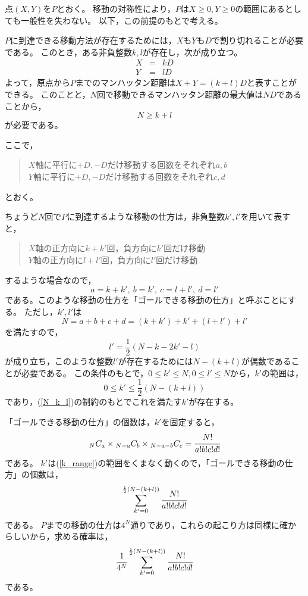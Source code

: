 \documentclass{article}
\begin{document}
点$(X, Y)$を$P$とおく。
移動の対称性により，$P$は$X \geq 0, Y \geq 0$の範囲にあるとしても一般性を失わない。
以下，この前提のもとで考える。

$P$に到達できる移動方法が存在するためには，$X$も$Y$も$D$で割り切れることが必要である。
このとき，ある非負整数$k, l$が存在し，次が成り立つ。
\begin{eqnarray*}
    X &=& kD \\
    Y &=& lD
\end{eqnarray*}
よって，原点から$P$までのマンハッタン距離は$X + Y = (k + l)D$と表すことができる。
このことと，$N$回で移動できるマンハッタン距離の最大値は$ND$であることから，
\begin{equation}
    \label{N_k_l}
    N \geq k + l
\end{equation}
が必要である。

ここで，
\begin{quote}
    $X$軸に平行に$+D, -D$だけ移動する回数をそれぞれ$a, b$ \\
    $Y$軸に平行に$+D, -D$だけ移動する回数をそれぞれ$c, d$
\end{quote}
とおく。

ちょうど$N$回で$P$に到達するような移動の仕方は，非負整数$k', l'$を用いて表すと，
\begin{quote}
    $X$軸の正方向に$k + k'$回，負方向に$k'$回だけ移動 \\
    $Y$軸の正方向に$l + l'$回，負方向に$l'$回だけ移動
\end{quote}
するような場合なので，
$$a = k + k',\ b = k',\ c = l + l',\ d = l'$$
である。このような移動の仕方を「ゴールできる移動の仕方」と呼ぶことにする。
ただし，$k', l'$は
$$N = a + b + c + d = (k + k') + k' + (l + l') + l'$$
を満たすので，
$$l' = \frac{1}{2} (N - k - 2k' - l)$$
が成り立ち，このような整数$l'$が存在するためには$N-(k+l)$が偶数であることが必要である。
この条件のもとで，$0 \leq k' \leq N, 0 \leq l' \leq N$から，$k'$の範囲は，
\begin{equation}
    \label{k_range}
    0 \leq k' \leq \frac{1}{2} (N - (k + l))
\end{equation}
であり，(\ref{N_k_l})の制約のもとでこれを満たす$k'$が存在する。

「ゴールできる移動の仕方」の個数は，$k'$を固定すると，
\[
    {}_N C_a \times {}_{N-a} C_b \times {}_{N-a-b} C_c = \cfrac{N!}{a!b!c!d!}
\]
である。
$k'$は(\ref{k_range})の範囲をくまなく動くので，「ゴールできる移動の仕方」の個数は，
\[
    \sum_{k' = 0}^{ \frac{1}{2} (N - (k + l)) } \cfrac{N!}{a!b!c!d!}
\]
である。
$P$までの移動の仕方は$4^N$通りであり，これらの起こり方は同様に確からしいから，求める確率は，
\[
    \cfrac{1}{4^N} \sum_{k' = 0}^{ \frac{1}{2} (N - (k + l)) } \cfrac{N!}{a!b!c!d!}
\]
である。
\end{document}
